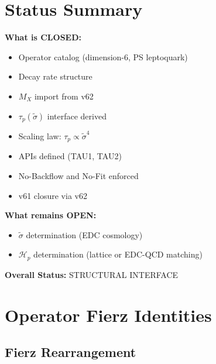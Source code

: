 \documentclass[11pt,a4paper]{article}
\theoremstyle{definition}
\begin{document}
\section{Status Summary}
\label{sec:status}

\begin{statusbox}
\textbf{What is CLOSED:}
\begin{itemize}
  \item[$\checkmark$] Operator catalog (dimension-6, PS leptoquark)
  \item[$\checkmark$] Decay rate structure
  \item[$\checkmark$] $M_X$ import from v62
  \item[$\checkmark$] $\tau_p(\tilde{\sigma})$ interface derived
  \item[$\checkmark$] Scaling law: $\tau_p \propto \tilde{\sigma}^4$
  \item[$\checkmark$] APIs defined (TAU1, TAU2)
  \item[$\checkmark$] No-Backflow and No-Fit enforced
  \item[$\checkmark$] v61 closure via v62
\end{itemize}

\textbf{What remains OPEN:}
\begin{itemize}
  \item[$\circ$] $\tilde{\sigma}$ determination (EDC cosmology)
  \item[$\circ$] $\mathcal{H}_p$ determination (lattice or EDC-QCD matching)
\end{itemize}

\textbf{Overall Status:} STRUCTURAL INTERFACE
\end{statusbox}

\appendix

\section{Operator Fierz Identities}
\label{app:fierz}

\subsection{Fierz Rearrangement}
\label{app:fierz-rearrange}
\end{document}
